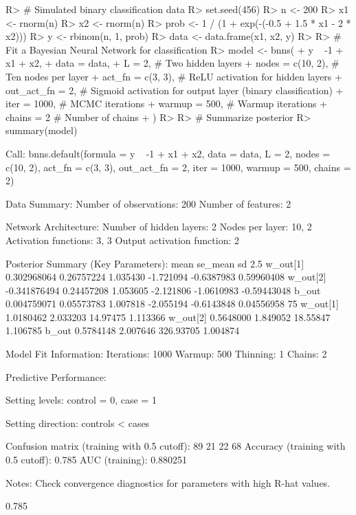 \documentclass[
]{jss}
\begin{document}
\begin{CodeChunk}
\begin{CodeInput}
R> # Simulated binary classification data
R> set.seed(456)
R> n <- 200
R> x1 <- rnorm(n)
R> x2 <- rnorm(n)
R> prob <- 1 / (1 + exp(-(-0.5 + 1.5 * x1 - 2 * x2)))
R> y <- rbinom(n, 1, prob)
R> data <- data.frame(x1, x2, y)
R> 
R> # Fit a Bayesian Neural Network for classification
R> model <- bnns(
+   y ~ -1 + x1 + x2,
+   data = data,
+   L = 2, # Two hidden layers
+   nodes = c(10, 2), # Ten nodes per layer
+   act_fn = c(3, 3), # ReLU activation for hidden layers
+   out_act_fn = 2, # Sigmoid activation for output layer (binary classification)
+   iter = 1000, # MCMC iterations
+   warmup = 500, # Warmup iterations
+   chains = 2 # Number of chains
+ )
R> 
R> # Summarize posterior
R> summary(model)
\end{CodeInput}
\begin{CodeOutput}
Call:
bnns.default(formula = y ~ -1 + x1 + x2, data = data, L = 2, 
    nodes = c(10, 2), act_fn = c(3, 3), out_act_fn = 2, iter = 1000, 
    warmup = 500, chains = 2)

Data Summary:
Number of observations: 200 
Number of features: 2 

Network Architecture:
Number of hidden layers: 2 
Nodes per layer: 10, 2 
Activation functions: 3, 3 
Output activation function: 2 

Posterior Summary (Key Parameters):
                 mean    se_mean       sd      2.5%
w_out[1]  0.302968064 0.26757224 1.035430 -1.721094 -0.6387983  0.59960408
w_out[2] -0.341876494 0.24457208 1.053605 -2.121806 -1.0610983 -0.59443048
b_out     0.004759071 0.05573783 1.007818 -2.055194 -0.6143848  0.04556958
               75%
w_out[1] 1.0180462 2.033203  14.97475 1.113366
w_out[2] 0.5648000 1.849052  18.55847 1.106785
b_out    0.5784148 2.007646 326.93705 1.004874

Model Fit Information:
Iterations: 1000 
Warmup: 500 
Thinning: 1 
Chains: 2 

Predictive Performance:
\end{CodeOutput}
\begin{CodeOutput}
Setting levels: control = 0, case = 1
\end{CodeOutput}
\begin{CodeOutput}
Setting direction: controls < cases
\end{CodeOutput}
\begin{CodeOutput}
Confusion matrix (training with 0.5 cutoff): 89 21 22 68 
Accuracy (training with 0.5 cutoff): 0.785 
AUC (training): 0.880251 

Notes:
Check convergence diagnostics for parameters with high R-hat values.
\end{CodeOutput}
\begin{CodeOutput}
[1] 0.785
\end{CodeOutput}
\end{CodeChunk}
\end{document}
